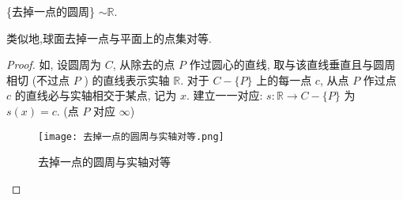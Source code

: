 \documentclass[../../main.tex]{subfiles}
\begin{document}
\begin{example}
\{去掉一点的圆周\} $\sim \mathbb{R}$.
\end{example}
\begin{note}
类似地,球面去掉一点与平面上的点集对等.
\end{note}
\begin{proof}
如, 设圆周为 $C$, 从除去的点 $P$ 作过圆心的直线, 取与该直线垂直且与圆周相切 (不过点 $P$ ) 的直线表示实轴 $\mathbb{R}$. 对于 $C - \{P\}$ 上的每一点 $c$, 从点 $P$ 作过点 $c$ 的直线必与实轴相交于某点, 记为 $x$. 建立一一对应: $s : \mathbb{R} \to C - \{P\}$ 为 $s(x) = c$. (点 $P$ 对应 $\infty$) 
\begin{figure}[H]
\centering
\texttt{[image: 去掉一点的圆周与实轴对等.png]}
\caption{去掉一点的圆周与实轴对等}
\label{figure:去掉一点的圆周与实轴对等}
\end{figure}

\end{proof}
\end{document}
